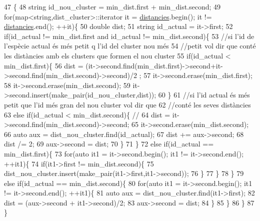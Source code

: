 \begin{DoxyCode}
47                                                                                                            
                 \{
48     \textcolor{keywordtype}{string} id\_nou\_cluster = min\_dist.first + min\_dist.second;
49     \textcolor{keywordflow}{for}(map<string,dist\_cluster>::iterator it = \hyperlink{class_cjt__clusters_a8e94e53830e3224d791dcf7dbd0a6082}{distancies}.begin(); it != 
      \hyperlink{class_cjt__clusters_a8e94e53830e3224d791dcf7dbd0a6082}{distancies}.end(); ++it)\{
50         \textcolor{keywordtype}{double} dist;
51         \textcolor{keywordtype}{string} id\_actual = it->first;
52         \textcolor{keywordflow}{if}(id\_actual != min\_dist.first and id\_actual != min\_dist.second)\{
53             \textcolor{comment}{//si l'id de l'espècie actual és més petit q l'id del cluster nou més }
54             \textcolor{comment}{//petit vol dir que conté les distàncies amb els clusters que formen el nou cluster}
55             \textcolor{keywordflow}{if}(id\_actual < min\_dist.first)\{ 
56                 dist = (it->second.find(min\_dist.first)->second+it->second.find(min\_dist.second)->second)/2
      ;
57                 it->second.erase(min\_dist.first);
58                 it->second.erase(min\_dist.second);
59                 it->second.insert(make\_pair(id\_nou\_cluster,dist));
60             \}
61             \textcolor{comment}{//si l'id actual és més petit que l'id més gran del nou cluster vol dir que}
62             \textcolor{comment}{//conté les seves distàncies}
63             \textcolor{keywordflow}{else} \textcolor{keywordflow}{if}(id\_actual < min\_dist.second)\{ \textcolor{comment}{// }
64                 dist = it->second.find(min\_dist.second)->second;
65                 it->second.erase(min\_dist.second);
66                 \textcolor{keyword}{auto} aux = dist\_nou\_cluster.find(id\_actual);
67                 dist += aux->second;
68                 dist /= 2;
69                 aux->second = dist;
70             \}
71         \}
72         \textcolor{keywordflow}{else} \textcolor{keywordflow}{if}(id\_actual == min\_dist.first)\{
73             \textcolor{keywordflow}{for}(\textcolor{keyword}{auto} it1 = it->second.begin(); it1 != it->second.end(); ++it1)\{
74                 \textcolor{keywordflow}{if}(it1->first != min\_dist.second)\{
75                     dist\_nou\_cluster.insert(make\_pair(it1->first,it1->second));
76                 \}
77             \}
78         \}
79         \textcolor{keywordflow}{else} \textcolor{keywordflow}{if}(id\_actual == min\_dist.second)\{
80             \textcolor{keywordflow}{for}(\textcolor{keyword}{auto} it1 = it->second.begin(); it1 != it->second.end(); ++it1)\{
81                 \textcolor{keyword}{auto} aux = dist\_nou\_cluster.find(it1->first);
82                 dist = (aux->second + it1->second)/2;
83                 aux->second = dist;
84             \}
85         \}
86     \}
87 \}
\end{DoxyCode}
\mbox{\label{class_cjt__clusters_a0675e6339f6a8fad8219518c377fbcf9}} 
